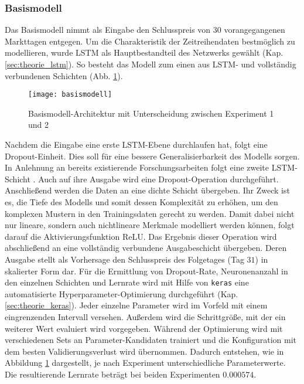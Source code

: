 \subsubsection{Basismodell}\label{sec:modellierung_basis_goog}

Das Basismodell nimmt als Eingabe den Schlusspreis von $30$ vorangegangenen Markttagen entgegen. Um die Charakteristik der Zeitreihendaten bestmöglich zu modellieren, wurde \ac{LSTM} als Hauptbestandteil des Netzwerks gewählt (Kap. \ref{sec:theorie_lstm}). So besteht das Modell zum einen aus LSTM- und vollständig verbundenen Schichten (Abb. \ref{fig:basismodell}). 
\begin{figure}[H]
	\centering
	\texttt{[image: basismodell]}
	\caption{Basismodell-Architektur mit Unterscheidung zwischen Experiment 1 und 2}
	\label{fig:basismodell}
\end{figure}
Nachdem die Eingabe eine erste \ac{LSTM}-Ebene durchlaufen hat, folgt eine Dropout-Einheit. Dies soll für eine bessere Generalisierbarkeit des Modells sorgen. In Anlehnung an bereits existierende Forschungsarbeiten folgt eine zweite \ac{LSTM}-Schicht \autocite[Kap. 4.2.1]{guan2020stockprice}. Auch auf ihre Ausgabe wird eine Dropout-Operation durchgeführt. Anschließend werden die Daten an eine dichte Schicht übergeben. Ihr Zweck ist es, die Tiefe des Modells und somit dessen Komplexität zu erhöhen, um den komplexen Mustern in den Trainingsdaten gerecht zu werden. Damit dabei nicht nur lineare, sondern auch nichtlineare Merkmale modelliert werden können, folgt darauf die Aktivierungsfunktion \ac{ReLU}. Das Ergebnis dieser Operation wird abschließend an eine vollständig verbundene Ausgabeschicht übergeben. Deren Ausgabe stellt als Vorhersage den Schlusspreis des Folgetages (Tag $31$) in skalierter Form dar.
Für die Ermittlung von Dropout-Rate, Neuronenanzahl in den einzelnen Schichten und Lernrate wird mit Hilfe von \texttt{keras} eine automatisierte Hyperparameter-Optimierung durchgeführt (Kap. \ref{sec:theorie_keras}). Jeder einzelne Parameter wird im Vorfeld mit einem eingrenzenden Intervall versehen. Außerdem wird die Schrittgröße, mit der ein weiterer Wert evaluiert wird vorgegeben. Während der Optimierung wird mit verschiedenen Sets an Parameter-Kandidaten trainiert und die Konfiguration mit dem besten Validierungsverlust wird übernommen. Dadurch entstehen, wie in Abbildung \ref{fig:basismodell} dargestellt, je nach Experiment unterschiedliche Parameterwerte. Die resultierende Lernrate beträgt bei beiden Experimenten $0.000574$.



